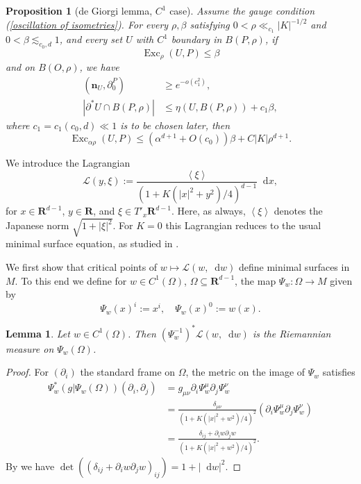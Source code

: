 \documentclass[reqno,11pt]{amsart}
\newcommand{\RR}{\mathbf{R}}
\DeclareMathOperator{\Exc}{Exc}
\newcommand*\dif{\mathop{}\!\mathrm{d}}
\newcommand{\Lagrange}{\mathscr L}
\newcommand{\normal}{\mathbf n}
\def\Japan#1{\left \langle #1 \right \rangle}
\newtheorem{lemma}[theorem]{Lemma}
\newtheorem{proposition}[theorem]{Proposition}
\theoremstyle{definition}
\numberwithin{equation}{section}
\begin{document}
\begin{proposition}[de Giorgi lemma, $C^1$ case]\label{Miranda44}
Assume the gauge condition (\ref{oscillation of isometries}).
For every $\rho, \beta$ satisfying $0 < \rho \ll_{c_1} |K|^{-1/2}$ and $0 < \beta \lesssim_{c_0, d} 1$, and every set $U$ with $C^1$ boundary in $B(P, \rho)$, if
$$\Exc_\rho(U, P) \leq \beta$$
and on $B(O, \rho)$, we have
\begin{align}
(\normal_U, \partial_0^P) &\geq e^{-o(c_1^2)}, \label{Miranda44 normal hyp} \\
|\partial^* U \cap B(P, \rho)| &\leq \eta(U, B(P, \rho)) + c_1 \beta, \label{Miranda44 minimality hyp}
\end{align}
where $c_1 = c_1(c_0, d) \ll 1$ is to be chosen later, then
\begin{equation}\label{Miranda44 concl}
\Exc_{\alpha \rho} (U, P) \leq (\alpha^{d + 1} + O(c_0)) \beta + C|K|\rho^{d + 1}.
\end{equation}
\end{proposition}

We introduce the Lagrangian
$$\Lagrange(y, \xi) := \frac{\Japan{\xi}}{(1 + K(|x|^2 + y^2)/4)^{d - 1}} \dif x,$$
for $x \in \RR^{d - 1}$, $y \in \RR$, and $\xi \in T'_x \RR^{d - 1}$.
Here, as always, $\Japan \xi$ denotes the Japanese norm $\sqrt{1 + |\xi|^2}$.
For $K = 0$ this Lagrangian reduces to the usual minimal surface equation, as studied in \cite[Chapter 6]{Giusti77}.

We first show that critical points of $w \mapsto \Lagrange(w, \dif w)$ define minimal surfaces in $M$.
To this end we define for $w \in C^1(\Omega)$, $\Omega \subseteq \RR^{d - 1}$, the map $\Psi_w: \Omega \to M$ given by
$$\Psi_w(x)^i := x^i, \quad \Psi_w(x)^0 := w(x).$$

\begin{lemma}\label{Plateau setup lemma}
Let $w \in C^1(\Omega)$. Then $(\Psi_w^{-1})^* \Lagrange(w, \dif w)$ is the Riemannian measure on $\Psi_w(\Omega)$.
\end{lemma}
\begin{proof}
For $(\partial_i)$ the standard frame on $\Omega$, the metric on the image of $\Psi_w$ satisfies
\begin{align*}
\Psi_w^*(g|\Psi_w(\Omega))(\partial_i, \partial_j) &= g_{\mu\nu} \partial_i \Psi_w^\mu \partial_j \Psi_w^\nu \\
&= \frac{\delta_{\mu\nu}}{(1 + K(|x|^2 + w^2)/4)^2} (\partial_i \Psi_w^\mu \partial_j \Psi_w^\nu) \\
&= \frac{\delta_{ij} + \partial_i w \partial_j w}{(1 + K(|x|^2 + w^2)/4)^2}.
\end{align*}
By \cite[(24)]{Petersen2008} we have $\det((\delta_{ij} + \partial_i w \partial_j w)_{ij}) = 1 + |\dif w|^2$.
\end{proof}
\end{document}
